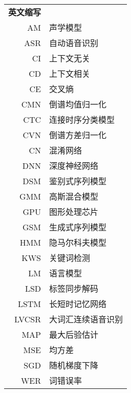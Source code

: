 \begin{longtable}{rl}
\textbf{英文缩写} \\
AM & 声学模型 \\
ASR & 自动语音识别 \\
CI & 上下文无关 \\
CD & 上下文相关 \\
CE & 交叉熵 \\
CMN & 倒谱均值归一化 \\
CTC & 连接时序分类模型 \\
CVN & 倒谱方差归一化 \\
CN & 混淆网络 \\
DNN & 深度神经网络 \\
DSM & 鉴别式序列模型 \\
GMM & 高斯混合模型 \\
GPU & 图形处理芯片 \\
GSM & 生成式序列模型 \\
HMM & 隐马尔科夫模型 \\
KWS & 关键词检测 \\
LM & 语言模型 \\
LSD & 标签同步解码 \\
LSTM & 长短时记忆网络 \\
LVCSR & 大词汇连续语音识别 \\
MAP & 最大后验估计 \\
MSE & 均方差 \\
SGD & 随机梯度下降 \\
WER & 词错误率 \\
\end{longtable}
